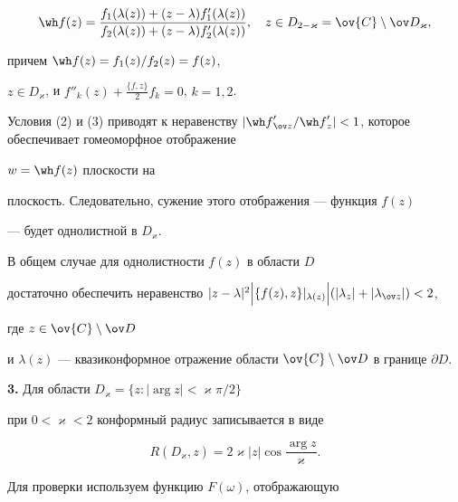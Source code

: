 $$ 


\wh f(z)=\frac{f_1(\lambda (z))+(z-\lambda)f'_1 (\lambda 


(z))}{f_2(\lambda (z))+(z-\lambda)f'_2(\lambda (z))},


\quad


z \in D_{2-\varkappa}=\ov {C}\setminus \ov D_{\varkappa},


$$


причем $\wh f(z)=f_1 (z)/f_{2} (z)=f(z)$,


$z \in D_{\varkappa}$, и $f''_k (z)+


\frac{\{f,z\}}{2}f_{k}=0$, $k=1,2$.





Условия (2) и (3) приводят к неравенству $|{\wh f}'_{\ov z} /{\wh 


f}'_z | < 1$, которое обеспечивает гомеоморфное отображение


$w=\wh f(z)$ плоскости на 


плоскость. Следовательно, сужение этого отображения --- функция $f(z)$


--- будет однолистной в $D_{\varkappa}$.





В общем случае для однолистности $f(z)$ в области $D$ 


достаточно обеспечить неравенство $|z-\lambda|^2\Big|\{f(z),z\}


|_{\lambda (z)}\Big|({|\lambda_z |+|\lambda_{\ov z} |}) < 2$,


где $z \in \ov {C}\setminus\ov D$ 


и $\lambda (z)$ --- квазиконформное отражение области $\ov 


{C}\setminus\ov D$ в границе $\partial D$.


\medskip








{\bf 3.} Для области $D_{\varkappa}=\{z:|\arg z|<\varkappa \pi /2\}$


при $0<\varkappa<2$ конформный радиус записывается в виде


\begin{equation}


R({D_{\varkappa},z})=2\varkappa |z|\cos\frac{{\arg z}}{{\varkappa}}.


\end{equation}


Для проверки используем функцию $F({\omega})$, отображающую 


